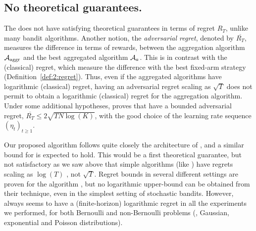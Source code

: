 \subsection{No theoretical guarantees.}\label{sub:25:theory}

The \Aggr{} does not have satisfying theoretical guarantees in terms of regret $R_T$, unlike many bandit algorithms.
%
Another notion, the \emph{adversarial regret}, denoted by $\overline{R_T}$,
measures the difference in terms of rewards,
between the aggregation algorithm $\mathcal{A}_{\mathrm{aggr}}$ and the best aggregated algorithm $\mathcal{A}_a$. This is in contrast with the (classical) regret, which measure the difference with the best fixed-arm strategy (Definition~\ref{def:2:regret}).
Thus, even if the aggregated algorithms have logarithmic (classical) regret, having an adversarial regret scaling as $\sqrt{T}$ does not permit to obtain a logarithmic (classical) regret for the aggregation algorithm.
%
%
Under some additional hypotheses,
\cite[Theorem 4.2]{Bubeck12} proves that
\ExpQ{} have a bounded adversarial regret, %
$\overline{R_T} \leq 2 \sqrt{T N \log(K)}$,
with the good choice of the learning rate sequence $(\eta_t)_{t \geq 1}$.

Our proposed algorithm follows quite closely the architecture of \ExpQ,
and a similar bound for \Aggr{} is expected to hold.
%
This would be a first theoretical guarantee, but not satisfactory as we saw above that simple algorithms (like \UCB) have regrets scaling as $\log(T)$ \cite{Auer02,Bubeck12}, not $\sqrt{T}$.
%
Regret bounds in several different settings are proven for the \CORRAL{} algorithm \cite{Agarwal16}, but no logarithmic upper-bound can be obtained from their technique, even in the simplest setting of stochastic bandits.
%
However, \Aggr{} always seems to have a (finite-horizon) logarithmic regret in all the experiments we performed,
for both Bernoulli and non-Bernoulli problems (\eg, Gaussian, exponential and Poisson distributions).




